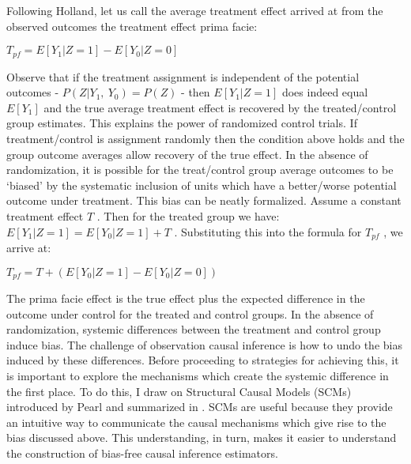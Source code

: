 \documentclass[../main.tex]{subfiles}
\begin{document}
\vspace{\baselineskip}
Following Holland, let us call the average treatment effect arrived at from the observed outcomes the treatment effect prima facie:\par


\vspace{\baselineskip}
\begin{adjustwidth}{0.5in}{0.0in}
 \( T_{pf}=E \left[ Y_{1}  \vert  Z=1 \right]  - E \left[ Y_{0}  \vert  Z=0 \right]  \) \par

\end{adjustwidth}


\vspace{\baselineskip}
Observe that if the treatment assignment is independent of the potential outcomes -  \( P \left( Z  \vert  Y_{1},~Y_{0} \right)  = P \left( Z \right)  \)  - then  \( E \left[ Y_{1}  \vert  Z=1 \right]  \) does indeed equal  \( E \left[ Y_{1} \right]  \)  and the true average treatment effect is recovered by the treated/control group estimates. This explains the power of randomized control trials. If treatment/control is assignment randomly then the condition above holds and the group outcome averages allow recovery of the true effect. In the absence of randomization, it is possible for the treat/control group average outcomes to be ‘biased’ by the systematic inclusion of units which have a better/worse potential outcome under treatment. This bias can be neatly formalized. Assume a constant treatment effect  \( T \) . Then for the treated group we have:  \( E \left[ Y_{1}  \vert  Z=1 \right]  = E \left[ Y_{0}  \vert  Z=1 \right]  + T \) . Substituting this into the formula for  \( T_{pf} \) , we arrive at:\par


\vspace{\baselineskip}
\begin{adjustwidth}{0.5in}{0.0in}
 \( T_{pf} = T + \left( E \left[ Y_{0}  \vert  Z = 1 \right]  - E \left[ Y_{0}  \vert  Z =0 \right]  \right)  \) \par

\end{adjustwidth}


\vspace{\baselineskip}
The prima facie effect is the true effect plus the expected difference in the outcome under control for the treated and control groups. In the absence of randomization, systemic differences between the treatment and control group induce bias. The challenge of observation causal inference is how to undo the bias induced by these differences. Before proceeding to strategies for achieving this, it is important to explore the mechanisms which create the systemic difference in the first place. To do this, I draw on Structural Causal Models (SCMs) introduced by Pearl and summarized in \textcite{Pearl2009CausalOverview}. SCMs are useful because they provide an intuitive way to communicate the causal mechanisms which give rise to the bias discussed above. This understanding, in turn, makes it easier to understand the construction of bias-free causal inference estimators.\par
\end{document}
